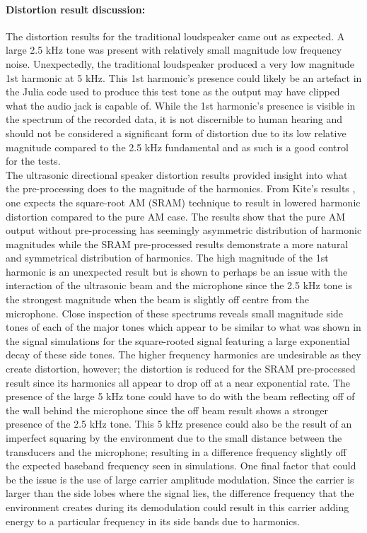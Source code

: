 \paragraph{Distortion result discussion:}
The distortion results for the traditional loudspeaker came out as expected. A large 2.5 kHz tone was present with relatively small magnitude low frequency noise. Unexpectedly, the traditional loudspeaker produced a very low magnitude 1st harmonic at 5 kHz. This 1st harmonic's presence could likely be an artefact in the Julia code used to produce this test tone as the output may have clipped what the audio jack is capable of. While the 1st harmonic's presence is visible in the spectrum of the recorded data, it is not discernible to human hearing and should not be considered a significant form of distortion due to its low relative magnitude compared to the 2.5 kHz fundamental and as such is a good control for the tests.\\
The ultrasonic directional speaker distortion results provided insight into what the pre-processing does to the magnitude of the harmonics. From Kite's results \cite{kite_post_hamilton_1998}, one expects the square-root AM (SRAM) technique to result in lowered harmonic distortion compared to the pure AM case. The results show that the pure AM output without pre-processing has seemingly asymmetric distribution of harmonic magnitudes while the SRAM pre-processed results demonstrate a more natural and symmetrical distribution of harmonics. The high magnitude of the 1st harmonic is an unexpected result but is shown to perhaps be an issue with the interaction of the ultrasonic beam and the microphone since the 2.5 kHz tone is the strongest magnitude when the beam is slightly off centre from the microphone. Close inspection of these spectrums reveals small magnitude side tones of each of the major tones which appear to be similar to what was shown in the signal simulations for the square-rooted signal featuring a large exponential decay of these side tones. The higher frequency harmonics are undesirable as they create distortion, however; the distortion is reduced for the SRAM pre-processed result since its harmonics all appear to drop off at a near exponential rate. The presence of the large 5 kHz tone could have to do with the beam reflecting off of the wall behind the microphone since the off beam result shows a stronger presence of the 2.5 kHz tone. This 5 kHz presence could also be the result of an imperfect squaring by the environment due to the small distance between the transducers and the microphone; resulting in a difference frequency slightly off the expected baseband frequency seen in simulations. One final factor that could be the issue is the use of large carrier amplitude modulation. Since the carrier is larger than the side lobes where the signal lies, the difference frequency that the environment creates during its demodulation could result in this carrier adding energy to a particular frequency in its side bands due to harmonics.\\
